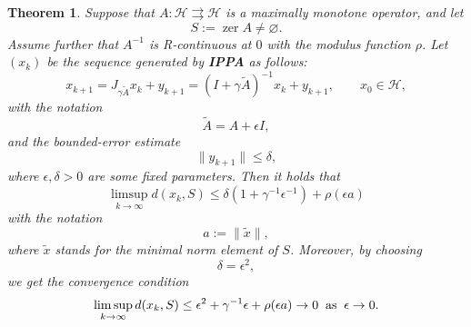 \documentclass[12pt]{article}
\theoremstyle{plain}
\newtheorem{theorem}{Theorem}
\newcommand{\zer}{\operatorname{zer}}
\begin{document}
\begin{theorem}\label{thm-prox}
Suppose that $A:\mathcal{H}\rightrightarrows \mathcal{H}$ is a maximally monotone operator, and let
\[
S:=\zer A\neq\varnothing.
\]
Assume further that $A^{-1}$ is R-continuous at $0$ with the modulus function $\rho$. Let $(x_k)$ be the sequence generated by \textbf{IPPA} as follows:
\[
x_{k+1}
=
J_{\gamma \widetilde{A}}x_k+y_{k+1}
=
(I+\gamma \widetilde{A})^{-1}x_k+y_{k+1},
\qquad x_0\in\mathcal{H},
\]
with the notation
\[
\widetilde{A}=A+\epsilon I,
\]
and the bounded-error estimate
\[
\|y_{k+1}\|\leq \delta,
\]
where $\epsilon,\delta>0$ are some fixed parameters. Then it holds that
\begin{equation*}
\limsup_{k\to\infty} d(x_k,S)
\leq
\delta(1+\gamma^{-1}\epsilon^{-1})
+
\rho(\epsilon a)
\end{equation*}
with the notation
\[
a:=\|\widetilde{x}\|,
\] 
where $\widetilde{x}$ stands for the minimal norm element of $S$. Moreover, by choosing
\[
\delta=\epsilon^2,
\]
we get the convergence condition
\begin{equation*}
\limsup_{k\to\infty} d(x_k,S)
\leq
\epsilon^2+\gamma^{-1}\epsilon+\rho(\epsilon a)\to 0 \;\; {\rm as}\; \;\epsilon\to 0.
\end{equation*}
\end{theorem}
\end{document}
